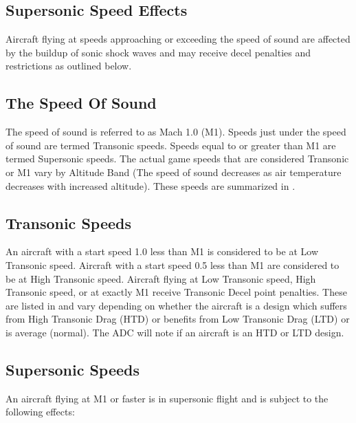\begin{advancedrules}
    \section{Supersonic Speed Effects}
    \label{rule:supersonic-speed-effects}


    Aircraft flying at speeds approaching or exceeding the speed of sound are affected by the buildup of sonic shock waves and may receive decel penalties and restrictions as outlined below.

    \subsection{The Speed Of Sound}
    The speed of sound is referred to as Mach 1.0 (M1). Speeds just under the speed of sound are termed Transonic speeds. Speeds equal to or greater than M1 are termed Supersonic speeds. The actual game speeds that are considered Transonic or M1 vary by Altitude Band (The speed of sound decreases as air temperature decreases with increased altitude). These speeds are summarized in .

    \subsection{Transonic Speeds}
    An aircraft with a start speed 1.0 less than M1 is considered to be at Low Transonic speed. Aircraft with a start speed 0.5 less than M1 are considered to be at High Transonic speed. Aircraft flying at Low Transonic speed, High Transonic speed, or at exactly M1 receive Transonic Decel point penalties. These are listed in  and vary depending on whether the aircraft is a design which suffers from High Transonic Drag (HTD) or benefits from Low Transonic Drag (LTD) or is average (normal). The ADC will note if an aircraft is an HTD or LTD design.


    \subsection{Supersonic Speeds}
    An aircraft flying at M1 or faster is in supersonic flight and is subject to the following effects:


\end{advancedrules}
